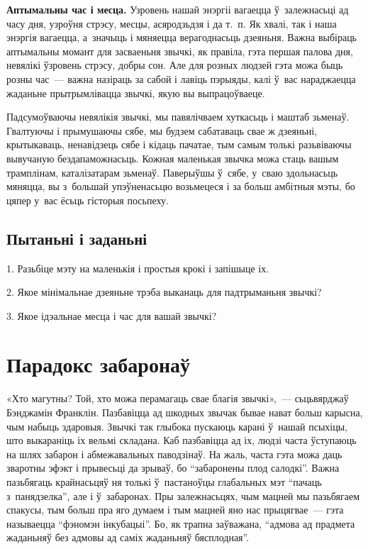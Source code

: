 \textbf{Аптымальны час і месца.} Узровень нашай энэргіі вагаецца ў~залежнасьці ад часу дня, узроўня стрэсу, месцы, асяродзьдзя і да т.~п. Як хвалі, так і наша энэргія вагаецца, а~значыць і мяняецца верагоднасьць дзеяньня. Важна выбіраць аптымальны момант для засваеньня звычкі, як правіла, гэта першая палова дня, невялікі ўзровень стрэсу, добры сон. Але для розных людзей гэта можа быць розны час~--- важна назіраць за сабой і лавіць пэрыяды, калі ў~вас нараджаецца жаданьне прытрымлівацца звычкі, якую вы выпрацоўваеце.

Падсумоўваючы невялікія звычкі, мы павялічваем хуткасьць і маштаб зьменаў. Гвалтуючы і прымушаючы сябе, мы будзем сабатаваць свае ж дзеяньні, крытыкаваць, ненавідзець сябе і кідаць пачатае, тым самым толькі разьвіваючы вывучаную бездапаможнасьць. Кожная маленькая звычка можа стаць вашым трамплінам, каталізатарам зьменаў. Паверыўшы ў~сябе, у~сваю здольнасьць мяняцца, вы з~большай упэўненасьцю возьмецеся і за больш амбітныя мэты, бо цяпер у~вас ёсьць гісторыя посьпеху.

\subsection*{Пытаньні і заданьні}

1. Разьбіце мэту на маленькія і простыя крокі і запішыце іх.

2. Якое мінімальнае дзеяньне трэба выканаць для падтрыманьня звычкі?

3. Якое ідэальнае месца і час для вашай звычкі?


\section{Парадокс забаронаў}

«Хто магутны? Той, хто можа перамагаць свае благія звычкі»,~--- сьцьвярджаў Бэнджамін Франклін. Пазбавіцца ад шкодных звычак бывае нават больш карысна, чым набыць здаровыя. Звычкі так глыбока пускаюць карані ў~нашай псыхіцы, што выкараніць іх вельмі складана. Каб пазбавіцца ад іх, людзі часта ўступаюць на шлях забарон і абмежавальных паводзінаў. На жаль, часта гэта можа даць зваротны эфэкт і прывесьці да зрываў, бо ``забаронены плод салодкі''. Важна пазьбягаць крайнасьцяў ня толькі ў~пастаноўцы глабальных мэт ``пачаць з~панядзелка'', але і ў~забаронах. Пры залежнасьцях, чым мацней мы пазьбягаем спакусы, тым больш пра яго думаем і тым мацней яно нас прыцягвае~--- гэта называецца ``фэномэн інкубацыі''. Бо, як трапна заўважана, ``адмова ад прадмета жаданьняў без адмовы ад саміх жаданьняў бясплодная''. 

